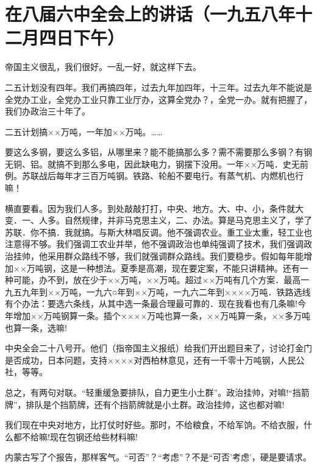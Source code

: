 \section[在八届六中全会上的讲话（一九五八年十二月四日下午）]{在八届六中全会上的讲话（一九五八年十二月四日下午）}


帝国主义很乱，我们很好。一乱一好，就这样下去。

二五计划没有四年。我们再搞四年，过去九年加四年，十三年。过去九年不能说是全党办工业，全党办工业只靠工业厅办，这算全党办？，全党一办。就有把握了，我们办政治三十年了。

二五计划搞××万吨，一年加××万吨。……

要这么多钢，要这么多铝，从哪里来？能不能搞那么多？需不需要那么多钢？有钢无铜、铝。就搞不到那么多电，因此缺电力，钢摆下没用。一年××万吨．史无前例。苏联战后每年才三百万吨钢。铁路、轮船不要电行。有蒸气机、内燃机也行嘛！

横直要看。因为我们人多。到处敲敲打打，中央、地方。大、中、小，条件就大变．一、人多。自然规律，并非马克思主义，二、办法。算是马克思主义了，学了苏联．你不搞．我就搞。与斯大林唱反调。他不强调农业。重工业太重，轻工业也注意得不够。我们强调工农业并举，他不强调政治也单纯强调了技术，我们强调政治挂帅，他采用群众路线不够，我们就强调群众路线。我们要稳步。假如每年能增加××万吨钢，这是一种想法。夏季是高潮，现在要定案，不能只讲精神。还有一种可能，办不到，放在少于××万吨，××万吨。超过××万吨有几个方案．最高一九五九年到××万吨，一九六○年到××万吨，一九六二年到××××万吨．铁路选线有个办法：要选六条线，从其中选一条最合理最可靠的．现在我看也有几条嘛!今年增加××万吨钢算一条。插个××××万吨也算一条，××万吨算一条，××多万吨也算一条，选嘛!

中央全会二十八号开。他们（指帝国主义报纸）给我们开出题目来了，讨论打金门是否成功，日本问题，支持××××对西柏林意见，还有一千零十万吨钢，人民公社，等等。

总之，有两句对联。“轻重缓急要排队，自力更生小土群”。政治挂帅，对嘛!“挡箭牌”，排队是个挡箭牌，还有个挡箭牌就是小土群。政治挂帅，这也都对嘛!

我们现在中央对地方，比打仗时好些。那时，不给粮食，不给军饷。不给衣服，什么都不给嘛!现在包钢还给些材料嘛!

内蒙古写了个报告，那样客气。“可否”？“考虑”？不是“可否’考虑’，硬是要请求。


